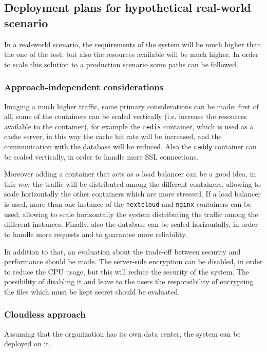 \subsection{Deployment plans for hypothetical real-world scenario}
\label{subsec:deployment-real-world}

In a real-world scenario, the requirements of the system will be much higher than the one of the test, but also the resources available will be much higher.
In order to scale this solution to a production scenario some paths can be followed. 

\subsubsection{Approach-independent considerations}
\label{subsubsec:approach-independent}

Imaging a much higher traffic, some primary considerations can be made: 
first of all, some of the containers can be scaled vertically (i.e. increase the resources available to the container), for example the \texttt{redis} container, which is used as a cache server, in this way the cache hit rate will be increased, and the communication with the database will be reduced.
Also the \texttt{caddy} container can be scaled vertically, in order to handle more SSL connections.

Moreover adding a container that acts as a load balancer can be a good idea, in this way the traffic will be distributed among the different containers, allowing to scale horizontally the other containers which are more stressed.
If a load balancer is used, more than one instance of the \texttt{nextcloud} and \texttt{nginx} containers can be used, allowing to scale horizontally the system distributing the traffic among the different instances.
Finally, also the database can be scaled horizontally, in order to handle more requests and to guarantee more reliability.

In addition to that, an evaluation about the trade-off between security and performance should be made. The server-side encryption can be disabled, in order to reduce the CPU usage, but this will reduce the security of the system. The possibility of disabling it and leave to the users the responsibility of encrypting the files which must be kept secret should be evaluated.

\subsubsection{Cloudless approach}
\label{subsubsec:cloudless}
Assuming that the organization has its own data center, the system can be deployed on it. 

